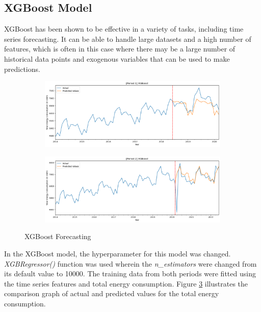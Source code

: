 \documentclass[runningheads]{llncs}
\begin{document}
\subsection{XGBoost Model}
XGBoost has been shown to be effective in a variety of tasks, including time series forecasting. It can be able to handle large datasets and a high number of features, which is often in this case where there may be a large number of historical data points and exogenous variables that can be used to make predictions.
\begin{figure}[h]
    \begin{subfigure}[h]{\textwidth}
         \centering
         \includegraphics[width=\textwidth]{xgboost/p1-XGBoost.png}
         \caption{}
         \label{fig:modelXGBoost-p1}
    \end{subfigure}
    \begin{subfigure}[h]{\textwidth}
         \centering
         \includegraphics[width=\textwidth]{xgboost/p2-XGBoost.png}
         \caption{}
         \label{fig:modelXGBoost-p2}
    \end{subfigure}
    \caption{XGBoost Forecasting}
    \label{fig:xgboost-model}
\end{figure}

In the XGBoost model, the hyperparameter for this model was changed. \textit{XGBRegressor()} function was used wherein the \textit{n\_estimators} were changed from its default value to 10000. The training data from both periods were fitted using the time series features and total energy consumption. Figure \ref{fig:xgboost-model} illustrates the comparison graph of actual and predicted values for the total energy consumption. 
\end{document}
